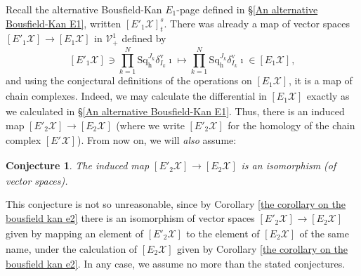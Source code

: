 \documentclass[11pt]{amsart} \renewcommand{\baselinestretch}{1.2}
\theoremstyle{plain}
\newtheorem{conjecture}{Conjecture}
\numberwithin{equation}{section} %
\theoremstyle{plain}
\newtheorem{conjecture}{Conjecture}
\numberwithin{equation}{chapter} %
\renewcommand{\to}{\longrightarrow}
\newcommand{\calV}{\mathcal{V}}
\newcommand{\calx}{\mathcal{X}}
\newcommand{\vect}[2]{\calV^{#1}_{#2}}
\newcommand{\Eprime}[5]{[E'_{#2}#3]^{#4}_{#5}}
\newcommand{\E}[5]{[E^{#1}_{#2}#3]^{#4}_{#5}}
\newcommand{\uver}{^\mathrm{v}}
\newcommand{\dhor}{_\mathrm{h}}
\newcommand{\Sqh}{\mathrm{Sq}\dhor}
\newcommand{\deltav}{\delta\uver}
\renewcommand{\mapsto}{\longmapsto}
\begin{document}
\begin{The Bousfield-Kan spectral sequence for a sphere}
Recall the alternative Bousfield-Kan $E_1$-page defined in \S\ref{An alternative Bousfield-Kan E1}, written $\Eprime{blank}{1}{\calx}{s}{t}$. There was already a map of vector spaces $\Eprime{blank}{1}{\calx}{}{}\to \E{}{1}{\calx}{}{}$  in $\vect{1}{+}$ defined by
\[\Eprime{blank}{1}{\calx}{}{}\ni \textstyle\prod_{k=1}^N\Sqh^{J_k}\deltav_{I_k}\imath\mapsto \textstyle\prod_{k=1}^N\Sqh^{J_k}\deltav_{I_k}\imath\in \E{}{1}{\calx}{}{},\]
and using the conjectural definitions of the operations on  $\E{}{1}{\calx}{}{}$, it is a map of chain complexes. Indeed, we may calculate the differential in $\E{}{1}{\calx}{}{}$ exactly as we calculated in \S\ref{An alternative Bousfield-Kan E1}. Thus, there is an induced map $\Eprime{blank}{2}{\calx}{}{}\to \E{}{2}{\calx}{}{}$ (where we write $\Eprime{blank}{2}{\calx}{}{}$ for the homology of the chain complex $\Eprime{blank}{}{\calx}{}{}$). From now on, we will \emph{also} assume:
\begin{conjecture}
\label{conjec2}
The induced map $\Eprime{blank}{2}{\calx}{}{}\to \E{}{2}{\calx}{}{}$ is an isomorphism (of vector spaces).
\end{conjecture}
\noindent This conjecture is not so unreasonable, since by Corollary \ref{the corollary on the bousfield kan e2} there is an isomorphism of vector spaces $\Eprime{blank}{2}{\calx}{}{}\to \E{}{2}{\calx}{}{}$ given by mapping an element of $\Eprime{blank}{2}{\calx}{}{}$ to the element of $\E{}{2}{\calx}{}{}$ of the same name, under the calculation of $\E{}{2}{\calx}{}{}$ given by Corollary \ref{the corollary on the bousfield kan e2}. In any case, we assume no more than the stated conjectures.


\end{The Bousfield-Kan spectral sequence for a sphere}
\end{document}

